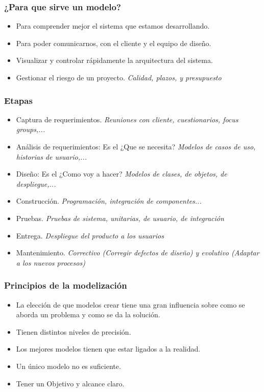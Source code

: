 \documentclass[titlepage,a4paper]{article}
\begin{document}
\subsubsection*{¿Para que sirve un modelo?}
    \begin{itemize}
        \item Para comprender mejor el sistema que estamos desarrollando.
        \item Para poder comunicarnos, con el cliente y el equipo de diseño.
        \item Visualizar y controlar rápidamente la arquitectura del sistema.
        \item Gestionar el riesgo de un proyecto. \textit{Calidad, plazos, y presupuesto}
    \end{itemize}

\subsubsection*{Etapas}
    \begin{itemize}
        \item Captura de requerimientos. \textit{Reuniones con cliente, cuestionarios, focus groups,...}
        \item Análisis de requerimientos: Es el ¿Que se necesita? \textit{Modelos de casos de uso, historias de usuario,...}
        \item Diseño: Es el ¿Como voy a hacer? \textit{Modelos de clases, de objetos, de despliegue,...}
        \item Construcción. \textit{Programación, integración de componentes...}
        \item Pruebas. \textit{Pruebas de sistema, unitarias, de usuario, de integración}
        \item Entrega. \textit{Despliegue del producto a los usuarios}
        \item Mantenimiento. \textit{Correctivo (Corregir defectos de diseño) y evolutivo (Adaptar a los nuevos procesos)}
    \end{itemize}

\subsubsection{Principios de la modelización}
    \begin{itemize}
        \item La elección de que modelos crear tiene una gran influencia sobre como se aborda un problema y como se da la solución.
        \item Tienen distintos niveles de precisión.
        \item Los mejores modelos tienen que estar ligados a la realidad.
        \item Un único modelo no es suficiente.
        \item Tener un Objetivo y alcance claro.
    \end{itemize}
\end{document}
